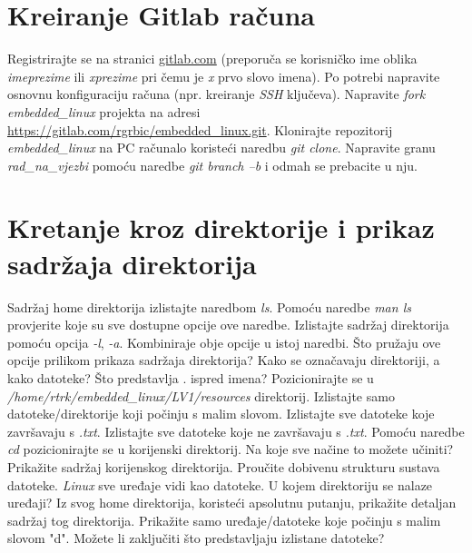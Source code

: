\documentclass[11pt]{article}
\begin{document}
\section{Kreiranje Gitlab računa}
Registrirajte se na stranici \url{gitlab.com} (preporuča se korisničko ime
 oblika \textit{imeprezime} ili \textit{xprezime} pri čemu je \textit{x} prvo
 slovo imena). Po potrebi napravite osnovnu konfiguraciju računa (npr.
 kreiranje \textit{SSH} ključeva). Napravite \textit{fork}
 \textit{embedded\_linux} projekta na adresi
 \url{https://gitlab.com/rgrbic/embedded\_linux.git}.
 \newline
 \newline
 Klonirajte repozitorij \textit{embedded\_linux} na PC računalo koristeći
 naredbu \textit{git clone}. Napravite granu \textit{rad\_na\_vjezbi} pomoću
 naredbe \textit{git branch –b} i odmah se prebacite u nju.
 \section{Kretanje kroz direktorije i prikaz sadržaja direktorija}
Sadržaj home direktorija izlistajte naredbom \textit{ls}. Pomoću naredbe
 \textit{man ls} provjerite koje su sve dostupne opcije ove naredbe. Izlistajte
 sadržaj direktorija pomoću opcija \textit{-l}, \textit{-a}. Kombiniraje obje
 opcije u istoj naredbi. Što pružaju ove opcije prilikom prikaza sadržaja
 direktorija? Kako se označavaju direktoriji, a kako datoteke? Što predstavlja
 . ispred imena?
\newline
\newline
Pozicionirajte se u \textit{/home/rtrk/embedded\_linux/LV1/resources}
 direktorij. Izlistajte samo datoteke/direktorije koji počinju s malim slovom.
 Izlistajte sve datoteke koje završavaju s \textit{.txt}. Izlistajte sve
 datoteke koje ne završavaju s \textit{.txt}.
\newline
\newline
Pomoću naredbe \textit{cd} pozicionirajte se u korijenski direktorij. Na koje
 sve načine to možete učiniti? Prikažite sadržaj korijenskog direktorija.
 Proučite dobivenu strukturu sustava datoteke.
\newline
\newline
\textit{Linux} sve uređaje vidi kao datoteke. U kojem direktoriju se nalaze
 uređaji? Iz svog home direktorija, koristeći apsolutnu putanju, prikažite
 detaljan sadržaj tog direktorija. Prikažite samo uređaje/datoteke koje počinju
 s malim slovom "d". Možete li zaključiti što predstavljaju izlistane datoteke?
\end{document}
